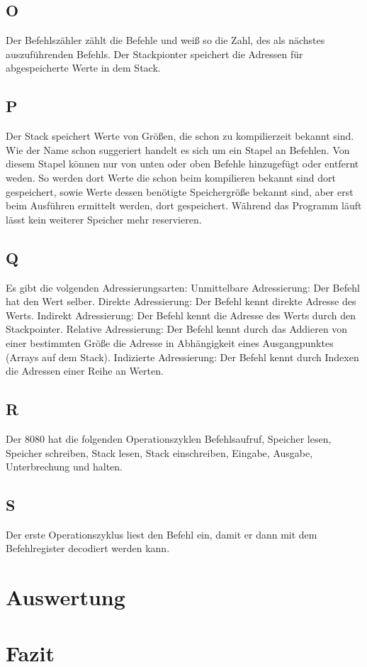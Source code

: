 \documentclass[10pt]{article}
\begin{document}
\begin{multicols}{2}
  \subsection*{O}
  Der Befehlszähler zählt die Befehle und weiß so die Zahl, des als nächstes auszuführenden Befehls. Der Stackpionter speichert die Adressen für abgespeicherte Werte in dem Stack.
  \subsection*{P}
  Der Stack speichert Werte von Größen, die schon zu kompilierzeit bekannt sind. Wie der Name schon suggeriert handelt es sich um ein Stapel an Befehlen. Von diesem Stapel können nur von unten oder oben Befehle hinzugefügt oder entfernt weden. So werden dort Werte die schon beim kompilieren bekannt sind dort gespeichert, sowie Werte dessen benötigte Speichergröße bekannt sind, aber erst beim Ausführen ermittelt werden, dort gespeichert. Während das Programm läuft lässt kein weiterer Speicher mehr reservieren.
  \subsection*{Q}
  Es gibt die volgenden Adressierungsarten:
  Unmittelbare Adressierung: Der Befehl hat den Wert selber.
  Direkte Adressierung: Der Befehl kennt direkte Adresse des Werts.
  Indirekt Adressierung: Der Befehl kennt die Adresse des Werts durch den Stackpointer.
  Relative Adressierung: Der Befehl kennt durch das Addieren von einer bestimmten Größe die Adresse in Abhängigkeit eines Ausgangpunktes (Arrays auf dem Stack).
  Indizierte Adressierung: Der Befehl kennt durch Indexen die Adressen einer Reihe an Werten.
  \subsection*{R}
  Der 8080 hat die folgenden Operationszyklen Befehlsaufruf, Speicher lesen, Speicher schreiben, Stack lesen, Stack einschreiben, Eingabe, Ausgabe, Unterbrechung und halten.
  \subsection*{S}
  Der erste Operationszyklus liest den Befehl ein, damit er dann mit dem Befehlregister decodiert werden kann.


  
	\section{Auswertung}
	\section{Fazit}
\end{multicols}
\end{document}
